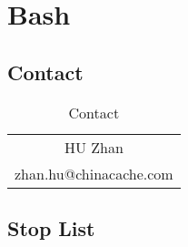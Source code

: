 \chapter{Bash}
\label{cha:bash}

\lstset{language=bash}

\section{Contact}
\label{sec:bash-contact}

\begin{table}[!h]
  \centering
  \begin{tabular}[!h]{c}
    \toprule{}
    HU Zhan \\
    zhan.hu@chinacache.com \\
    \bottomrule
  \end{tabular}
  \caption{Contact}
\end{table}

\section{Stop List}
\label{sec:bash-stop-list}

